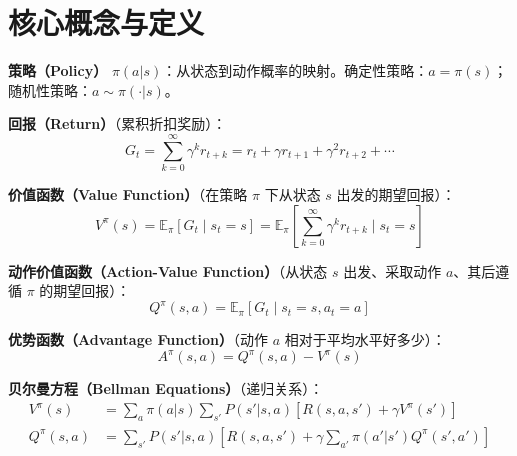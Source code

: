 \section{核心概念与定义}
\label{core-concepts-and-definitions}

\textbf{策略（Policy）} $\pi(a|s)$：从状态到动作概率的映射。确定性策略：$a = \pi(s)$；随机性策略：$a \sim \pi(\cdot|s)$。

\textbf{回报（Return）}（累积折扣奖励）：
\begin{equation}
G_t = \sum_{k=0}^{\infty} \gamma^k r_{t+k} = r_t + \gamma r_{t+1} + \gamma^2 r_{t+2} + \cdots
\end{equation}

\textbf{价值函数（Value Function）}（在策略 $\pi$ 下从状态 $s$ 出发的期望回报）：
\begin{equation}
V^\pi(s) = \mathbb{E}_\pi\left[G_t \mid s_t = s\right] = \mathbb{E}_\pi\left[\sum_{k=0}^{\infty} \gamma^k r_{t+k} \mid s_t = s\right]
\end{equation}

\textbf{动作价值函数（Action-Value Function）}（从状态 $s$ 出发、采取动作 $a$、其后遵循 $\pi$ 的期望回报）：
\begin{equation}
Q^\pi(s, a) = \mathbb{E}_\pi\left[G_t \mid s_t = s, a_t = a\right]
\end{equation}

\textbf{优势函数（Advantage Function）}（动作 $a$ 相对于平均水平好多少）：
\begin{equation}
A^\pi(s, a) = Q^\pi(s, a) - V^\pi(s)
\end{equation}

\textbf{贝尔曼方程（Bellman Equations）}（递归关系）：
\begin{align}
V^\pi(s) &= \sum_a \pi(a|s) \sum_{s'} P(s'|s,a)\left[R(s,a,s') + \gamma V^\pi(s')\right] \\
Q^\pi(s,a) &= \sum_{s'} P(s'|s,a)\left[R(s,a,s') + \gamma \sum_{a'} \pi(a'|s') Q^\pi(s', a')\right]
\end{align}

